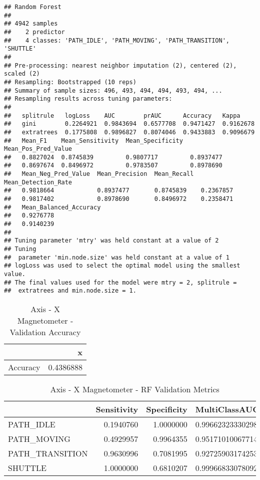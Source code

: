 \documentclass[]{article}
\begin{document}
\begin{verbatim}
## Random Forest 
## 
## 4942 samples
##    2 predictor
##    4 classes: 'PATH_IDLE', 'PATH_MOVING', 'PATH_TRANSITION', 'SHUTTLE' 
## 
## Pre-processing: nearest neighbor imputation (2), centered (2), scaled (2) 
## Resampling: Bootstrapped (10 reps) 
## Summary of sample sizes: 496, 493, 494, 494, 493, 494, ... 
## Resampling results across tuning parameters:
## 
##   splitrule   logLoss    AUC        prAUC      Accuracy   Kappa    
##   gini        0.2264921  0.9843694  0.6577708  0.9471427  0.9162678
##   extratrees  0.1775808  0.9896827  0.8074046  0.9433883  0.9096679
##   Mean_F1    Mean_Sensitivity  Mean_Specificity  Mean_Pos_Pred_Value
##   0.8827024  0.8745839         0.9807717         0.8937477          
##   0.8697674  0.8496972         0.9783507         0.8978690          
##   Mean_Neg_Pred_Value  Mean_Precision  Mean_Recall  Mean_Detection_Rate
##   0.9818664            0.8937477       0.8745839    0.2367857          
##   0.9817402            0.8978690       0.8496972    0.2358471          
##   Mean_Balanced_Accuracy
##   0.9276778             
##   0.9140239             
## 
## Tuning parameter 'mtry' was held constant at a value of 2
## Tuning
##  parameter 'min.node.size' was held constant at a value of 1
## logLoss was used to select the optimal model using the smallest value.
## The final values used for the model were mtry = 2, splitrule =
##  extratrees and min.node.size = 1.
\end{verbatim}

\begin{table}[!h]

\caption{\label{tab:sensor-x-mag-rf-results}Axis - X Magnetometer - Validation Accuracy}
\centering
\begin{tabular}[t]{lr}
\toprule
  & x\\
\midrule
Accuracy & 0.4386888\\
\bottomrule
\end{tabular}
\end{table}

\begin{table}[!h]

\caption{\label{tab:sensor-x-mag-rf-results}Axis - X Magnetometer - RF Validation Metrics}
\centering
\begin{tabular}[t]{lrrl}
\toprule
  & Sensitivity & Specificity & MultiClassAUC\\
\midrule
PATH\_IDLE & 0.1940760 & 1.0000000 & 0.996623233302981\\
PATH\_MOVING & 0.4929957 & 0.9964355 & 0.951710100677141\\
PATH\_TRANSITION & 0.9630996 & 0.7081995 & 0.927259031742533\\
SHUTTLE & 1.0000000 & 0.6810207 & 0.999668330780922\\
\bottomrule
\end{tabular}
\end{table}
\end{document}
